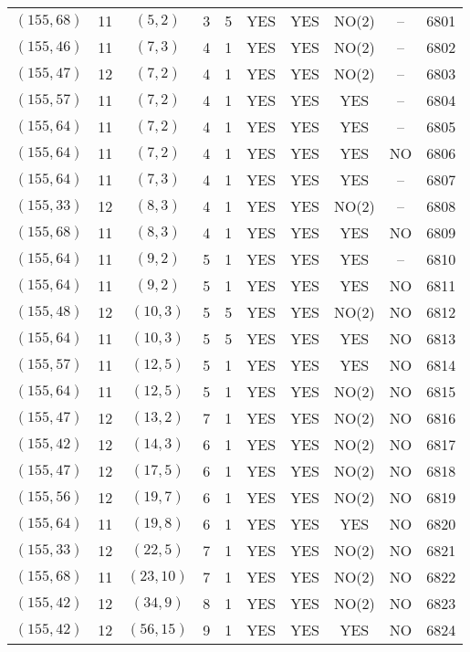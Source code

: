 \begin{longtable}{|c|c|c|c|c|c|c|c|c|c|}
$(155, 68)$ & 11 & $(5, 2)$ & 3 & 5 & YES & YES & NO(2) & -- & 6801\\
$(155, 46)$ & 11 & $(7, 3)$ & 4 & 1 & YES & YES & NO(2) & -- & 6802\\
$(155, 47)$ & 12 & $(7, 2)$ & 4 & 1 & YES & YES & NO(2) & -- & 6803\\
$(155, 57)$ & 11 & $(7, 2)$ & 4 & 1 & YES & YES & YES & -- & 6804\\
$(155, 64)$ & 11 & $(7, 2)$ & 4 & 1 & YES & YES & YES & -- & 6805\\
$(155, 64)$ & 11 & $(7, 2)$ & 4 & 1 & YES & YES & YES & NO & 6806\\
$(155, 64)$ & 11 & $(7, 3)$ & 4 & 1 & YES & YES & YES & -- & 6807\\
$(155, 33)$ & 12 & $(8, 3)$ & 4 & 1 & YES & YES & NO(2) & -- & 6808\\
$(155, 68)$ & 11 & $(8, 3)$ & 4 & 1 & YES & YES & YES & NO & 6809\\
$(155, 64)$ & 11 & $(9, 2)$ & 5 & 1 & YES & YES & YES & -- & 6810\\
$(155, 64)$ & 11 & $(9, 2)$ & 5 & 1 & YES & YES & YES & NO & 6811\\
$(155, 48)$ & 12 & $(10, 3)$ & 5 & 5 & YES & YES & NO(2) & NO & 6812\\
$(155, 64)$ & 11 & $(10, 3)$ & 5 & 5 & YES & YES & YES & NO & 6813\\
$(155, 57)$ & 11 & $(12, 5)$ & 5 & 1 & YES & YES & YES & NO & 6814\\
$(155, 64)$ & 11 & $(12, 5)$ & 5 & 1 & YES & YES & NO(2) & NO & 6815\\
$(155, 47)$ & 12 & $(13, 2)$ & 7 & 1 & YES & YES & NO(2) & NO & 6816\\
$(155, 42)$ & 12 & $(14, 3)$ & 6 & 1 & YES & YES & NO(2) & NO & 6817\\
$(155, 47)$ & 12 & $(17, 5)$ & 6 & 1 & YES & YES & NO(2) & NO & 6818\\
$(155, 56)$ & 12 & $(19, 7)$ & 6 & 1 & YES & YES & NO(2) & NO & 6819\\
$(155, 64)$ & 11 & $(19, 8)$ & 6 & 1 & YES & YES & YES & NO & 6820\\
$(155, 33)$ & 12 & $(22, 5)$ & 7 & 1 & YES & YES & NO(2) & NO & 6821\\
$(155, 68)$ & 11 & $(23, 10)$ & 7 & 1 & YES & YES & NO(2) & NO & 6822\\
$(155, 42)$ & 12 & $(34, 9)$ & 8 & 1 & YES & YES & NO(2) & NO & 6823\\
$(155, 42)$ & 12 & $(56, 15)$ & 9 & 1 & YES & YES & YES & NO & 6824\\

\end{longtable}
